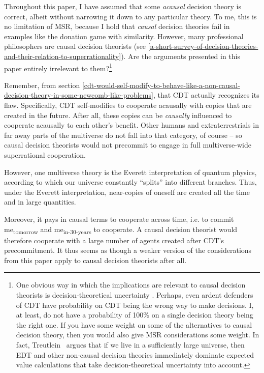Throughout this paper, I have assumed that some \emph{acausal} decision
theory is correct, albeit without narrowing it down to any particular
theory. To me, this is no limitation of MSR, because I hold that
\emph{causal} decision theories fail in examples like the donation game
with similarity. However, many professional philosophers are causal
decision theorists (see
\ref{a-short-survey-of-decision-theories-and-their-relation-to-superrationality}). Are the arguments presented in this paper
entirely irrelevant to them?\footnote{One obvious way in which the
  implications are relevant to causal decision theorists is
  decision-theoretical uncertainty
  \parencite{MacAskill2016-zo}. Perhaps, even ardent
  defenders of CDT have probability on CDT being the wrong way to make
  decisions. I, at least, do not have a probability of 100\% on a single
  decision theory being the right one. If you have some weight on some
  of the alternatives to causal decision theory, then you would also
  give MSR considerations some weight. In fact, Treutlein~\citeyear{Treutlein201X} 
  argues that if we live in a sufficiently large universe,
  then EDT and other non-causal decision theories immediately dominate
  expected value calculations that take decision-theoretical uncertainty
  into account.}

Remember, from section
\ref{cdt-would-self-modify-to-behave-like-a-non-causal-decision-theory-in-some-newcomb-like-problems}, that CDT actually recognizes its flaw. Specifically,
CDT self-modifies to cooperate acausally with copies that are created in
the future. After all, these copies can be \emph{causally} influenced to
cooperate acausally to each other's benefit. Other humans and
extraterrestrials in far away parts of the multiverse do not fall into
that category, of course -- so causal decision theorists would not
precommit to engage in full multiverse-wide superrational cooperation.

However, one multiverse theory is the Everett interpretation of quantum
physics, according to which our universe constantly ``splits'' into
different branches. Thus, under the Everett interpretation, near-copies
of oneself are created all the time and in large quantities.

Moreover, it pays in causal terms to cooperate across time, i.e. to
commit me\textsubscript{tomorrow} and me\textsubscript{in-30-years} to
cooperate. A causal decision theorist would therefore cooperate with a
large number of agents created after CDT's precommitment. It thus seems
as though a weaker version of the considerations from this paper apply
to causal decision theorists after all.

